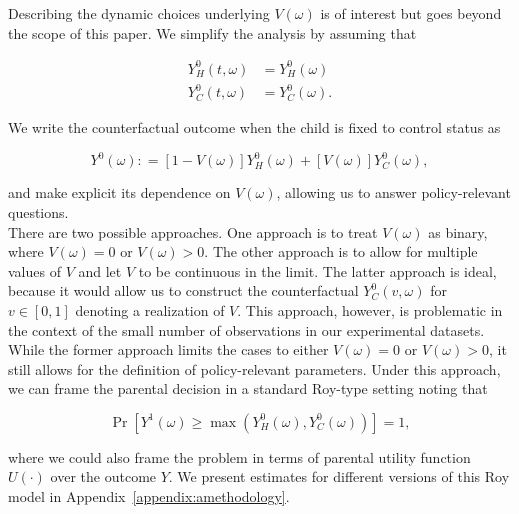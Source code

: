 \noindent Describing the dynamic choices underlying $V \left ( \omega \right)$ is of interest but goes beyond the scope of this paper. We simplify the analysis by assuming that 

\begin{align}
Y_H^0 \left( t, \omega \right) &= Y_H^0 \left( \omega \right) \nonumber \\
Y_C^0 \left( t, \omega \right) &= Y_C^0 \left( \omega \right).
\end{align}

\noindent We write the counterfactual outcome when the child is fixed to control status as 

\begin{equation}
Y^0 \left( \omega \right) : = \left[ 1 - V \left( \omega \right) \right] Y_H^0 \left( \omega \right) + \left[ V \left( \omega \right) \right] Y_C^0 \left( \omega \right), 
\end{equation}

\noindent and make explicit its dependence on $V \left( \omega \right)$, allowing us to answer policy-relevant questions.\\

\noindent There are two possible approaches. One approach is to treat $V \left( \omega \right)$ as binary, where $V \left( \omega \right) = 0$ or $V \left( \omega \right)  > 0$. The other approach is to allow for multiple values of $V$ and let $V$ to be continuous in the limit. The latter approach is ideal, because it would allow us to construct the counterfactual $Y_C^0 \left( v,  \omega \right) $ for $v \in [0 , 1]$ denoting a realization of $V$. This approach, however, is problematic in the context of the small number of observations in our experimental datasets. While the former approach limits the cases to either $V \left( \omega \right) = 0$ or $V \left( \omega \right)  > 0$, it still allows for the definition of policy-relevant parameters. Under this approach, we can frame the parental decision in a standard Roy-type setting noting that 

\begin{equation}
\Pr \left[ Y^1 \left( \omega \right) \geq \max \left(  Y_{H}^0 \left( \omega \right) ,  Y_{C}^0 \left( \omega \right)   \right) \right] = 1, \label{eq:noutility}
\end{equation}

\noindent where we could also frame the problem in terms of parental utility function $U \left( \cdot \right) $ over the outcome $Y$. We present estimates for different versions of this Roy model in Appendix~\ref{appendix:amethodology}.\\ 

